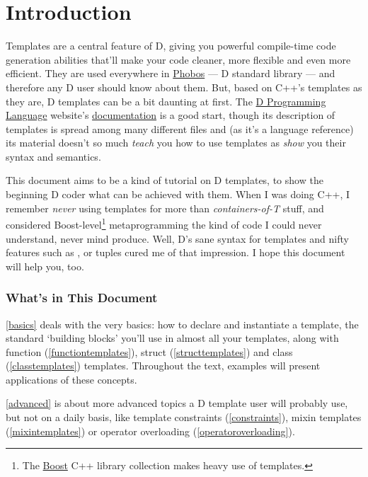 \newpage
{}
\part*{Introduction}\label{intro} %

Templates are a central feature of D, giving you powerful compile-time code generation abilities that'll make your code cleaner, more flexible and even more efficient. They are used everywhere in \href{http://www.dlang.org/phobos/}{Phobos} --- D standard library --- and therefore any D user should know about them. But, based on C++'s templates as they are, D templates can be a bit daunting at first. The \href{http://www.dlang.org}{D Programming Language} website's \href{http://www.dlang.org/template.html}{documentation} is a good start, though its description of templates is spread among many different files and (as it's a language reference) its material doesn't so much \emph{teach} you how to use templates as \emph{show} you their syntax and semantics.

This document aims to be a kind of tutorial on D templates, to show the beginning D coder what can be achieved with them. When I was doing C++, I remember \emph{never} using templates for more than \emph{containers-of-T} stuff, and considered Boost-level\footnote{ The \href{http://www.boost.org}{Boost} C++ library collection makes heavy use of templates.} metaprogramming the kind of code I could never understand, never mind produce. Well, D's sane syntax for templates and nifty features such as ,  or tuples cured me of that impression. I hope this document will help you, too.

\section*{What's in This Document}\label{content}

\autoref{basics} deals with the very basics: how to declare and instantiate a template, the standard `building blocks' you'll use in almost all your templates, along with function (\ref{functiontemplates}), struct (\ref{structtemplates}) and class (\ref{classtemplates}) templates. Throughout the text, examples will present applications of these concepts. 

\autoref{advanced} is about more advanced topics a D template user will probably use, but not on a daily basis, like template constraints (\ref{constraints}), mixin templates (\ref{mixintemplates}) or operator overloading (\ref{operatoroverloading}). 

